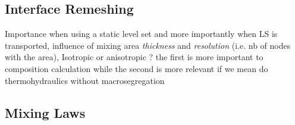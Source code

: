 \subsection{Interface Remeshing}
Importance when using a static level set and more importantly when LS is transported,
influence of mixing area \emph{thickness} and \emph{resolution} (i.e. nb of nodes with the area),
Isotropic or anisotropic ? the first is more important to composition calculation while the second
is more relevant if we mean do thermohydraulics without macrosegregation

\subsection{Mixing Laws}